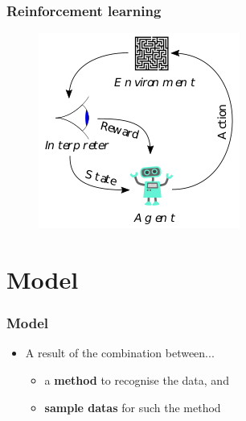 \documentclass[]{beamer}
\begin{document}
\begin{frame}
\frametitle{Reinforcement learning}
\begin{figure}
\includegraphics[scale=.7]{imgs/reinforcement_learning.png}
\end{figure}
\end{frame}

\section{Model}

\begin{frame}
\frametitle{Model}
\begin{itemize}
\item<2-> A result of the combination between...
\begin{itemize}
\item<3-> a \textbf{method} to recognise the data, and
\item<4-> \textbf{sample datas} for such the method
\end{itemize}
\end{itemize}
\end{frame}
\end{document}
